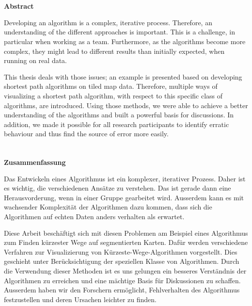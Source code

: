 \chapter*{}

\begin{center}
    \large \textbf{Abstract}
\end{center}

Developing an algorithm is a complex, iterative process.
Therefore, an understanding of the different approaches is important.
This is a challenge, in particular when working as a team.
Furthermore, as the algorithms become more complex, they might lead to different results than initially expected, when running on real data.

This thesis deals with those issues; an example is presented based on developing shortest path algorithms on tiled map data.
Therefore, multiple ways of visualizing a shortest path algorithm, with respect to this specific class of algorithms, are introduced.
Using those methods, we were able to achieve a better understanding of the algorithms and built a powerful basis for discussions.
In addition, we made it possible for all research participants to identify erratic behaviour and thus find the source of error more easily.

\newpage\null\thispagestyle{empty}\newpage
\chapter*{}

\begin{center}
    \large \textbf{Zusammenfassung}
\end{center}

Das Entwickeln eines Algorithmus ist ein komplexer, iterativer Prozess.
Daher ist es wichtig, die verschiedenen Ansätze zu verstehen.
Das ist gerade dann eine Herausvorderung, wenn in einer Gruppe gearbeitet wird.
Ausserdem kann es mit wachsender Komplexität der Algorithmen dazu kommen, dass sich die Algorithmen auf echten Daten anders verhalten als erwartet.

Diese Arbeit beschäftigt sich mit diesen Problemen am Beispiel eines Algorithmus zum Finden kürzester Wege auf segmentierten Karten.
Dafür werden verschiedene Verfahren zur Visualizierung von Kürzeste-Wege-Algorithmen vorgestellt.
Dies geschieht unter Berücksichtigung der speziellen Klasse von Algorithmen.
Durch die Verwendung dieser Methoden ist es uns gelungen ein besseres Verständnis der Algorithmen zu erreichen und eine mächtige Basis für Diskussionen zu schaffen.
Ausserdem haben wir den Forschern ermöglicht, Fehlverhalten des Algorithmus festzustellen und deren Ursachen leichter zu finden.
